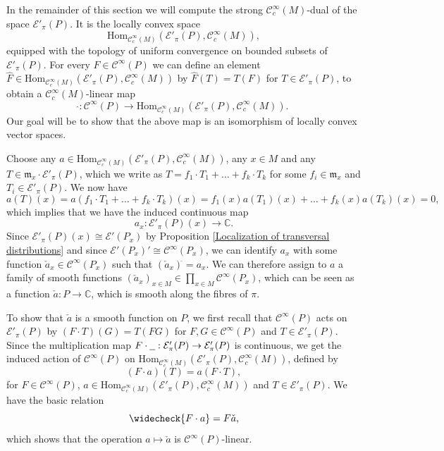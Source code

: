 \documentclass[a4paper]{amsart}
\newcommand{\CC}{\mathbb{C}}
\newcommand{\cE}{\mathcal{E}}
\newcommand{\Hom}{\text{Hom}}
\newcommand{\fm}{\mathfrak{m}}
\newcommand{\C}{\mathord{\mathcal{C}^{\infty}}}
\newcommand{\Cc}{\mathord{\mathcal{C}^{\infty}_{c}}}
\begin{document}
In the remainder of this section we will compute the strong $\Cc(M)$-dual of the space $\cE'_{\pi}(P)$. It is the locally convex space
\[
\Hom_{\Cc(M)}(\cE'_{\pi}(P),\Cc(M)),
\]
equipped with the topology of uniform convergence on 
bounded subsets of $\cE'_{\pi}(P)$. For every $F\in\C(P)$ we can define an element 
$\hat{F}\in\Hom_{\Cc(M)}(\cE'_{\pi}(P),\Cc(M))$ by $\hat{F}(T)=T(F)$ for $T\in\cE'_{\pi}(P)$, to
obtain a $\Cc(M)$-linear map
\[
\hat{}:\C(P)\to\Hom_{\Cc(M)}(\cE'_{\pi}(P),\Cc(M)).
\]
Our goal will be to show that the above map is an isomorphism of locally convex vector spaces.

Choose any $a\in\Hom_{\Cc(M)}(\cE'_{\pi}(P),\Cc(M))$, any $x\in M$ and any $T\in\fm_{x}\cdot\cE'_{\pi}(P)$, 
which we write as $T=f_{1}\cdot T_{1}+\ldots+f_{k}\cdot T_{k}$ for some $f_{i}\in\fm_{x}$ and $T_{i}\in\cE'_{\pi}(P)$. We now have
\[
a(T)(x)=a(f_{1}\cdot T_{1}+\ldots+f_{k}\cdot T_{k})(x)=f_{1}(x)a(T_{1})(x)+\ldots+f_{k}(x)a(T_{k})(x)=0,
\]
which implies that we have the induced continuous map
\[
a_{x}:\cE'_{\pi}(P)(x)\to\CC.
\]
Since $\cE'_{\pi}(P)(x)\cong\cE'(P_{x})$ by Proposition \ref{Localization of transversal distributions} and since $\cE'(P_{x})'\cong\C(P_{x})$, we can identify 
$a_{x}$ with some function $\check{a}_{x}\in\C(P_{x})$ such that $(\check{a}_{x})^{\hat{}}=a_{x}$. We can therefore assign
to $a$ a family of smooth functions $(\check{a}_{x})_{x\in M}\in\prod_{x\in M}\C(P_{x})$, which can be seen as
a function $\check{a}:P\to\CC$, which is smooth along the fibres of $\pi$. 

To show that $\check{a}$ is a smooth function on $P$, we first recall that $\C(P)$ acts on $\cE'_{\pi}(P)$ by $(F\cdot T)(G)=T(FG)$ 
for $F,G\in\C(P)$ and $T\in\cE'_{\pi}(P)$.
Since the multiplication map $F\cdot\underline{\hspace{2mm}}:\cE'_{\pi}(P)\to\cE'_{\pi}(P)$ is continuous,
we get the induced action of $\C(P)$ on $\Hom_{\Cc(M)}(\cE'_{\pi}(P),\Cc(M))$, defined by
\[
(F\cdot a)(T)=a(F\cdot T),
\]
for $F\in\C(P)$, $a\in\Hom_{\Cc(M)}(\cE'_{\pi}(P),\Cc(M))$ and $T\in\cE'_{\pi}(P)$. We have the basic relation
\[
\widecheck{F\cdot a}=F\check{a},
\]
which shows that the operation $a\mapsto\check{a}$ is $\C(P)$-linear.
\end{document}
